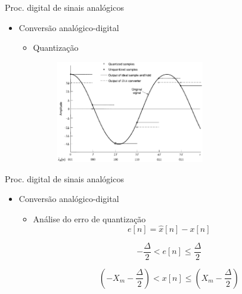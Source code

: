 \begin{slide}{Proc. digital de sinais anal\'ogicos}
\begin{itemize}
   \item Conversão analógico-digital
   \begin{itemize}
      \item Quantização 
      \begin{figure}
        \centering
         \includegraphics[width = 0.65\textwidth]{figs/ad_quantz2.eps}
      \end{figure}

   \end{itemize}
\end{itemize}
\end{slide}

\begin{slide}{Proc. digital de sinais anal\'ogicos}
\begin{itemize}
   \item Conversão analógico-digital
   \begin{itemize}
      \item Análise do erro de quantização
      \begin{equation}
        e[n] = \hat x[n] - x[n]
      \end{equation}

        \begin{equation}
         -\frac{\Delta}{2}<e[n]\leq \frac{\Delta}{2}
        \end{equation}

        \begin{equation}
         \left (-X_m-\frac{\Delta}{2}\right )<x[n]\leq \left (X_m-\frac{\Delta}{2}\right )
        \end{equation}



   \end{itemize}
\end{itemize}
\end{slide}

